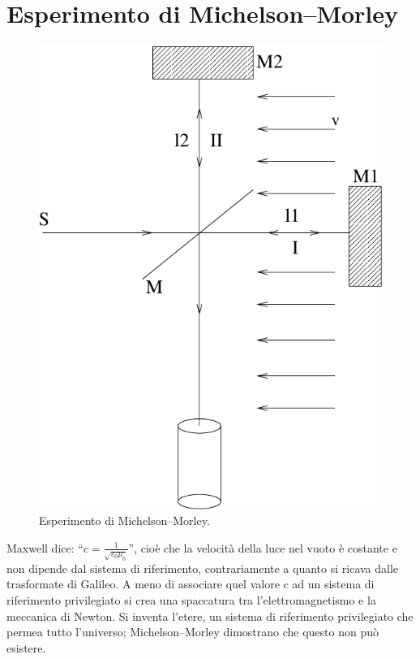 \section{Esperimento di Michelson--Morley}
\begin{figure}[htbp]
\centering
\includegraphics[scale=0.7]{immagini/fisica1/Morley}
\caption{Esperimento di Michelson--Morley.}
\end{figure}
Maxwell dice: ``$c=\frac{1}{\sqrt{\varepsilon_0\mu_0}}$'', cioè che la velocità della luce nel vuoto è costante e non dipende dal sistema di riferimento, contrariamente a quanto si ricava dalle trasformate di Galileo. A meno di associare quel valore $c$ ad un sistema di riferimento privilegiato si crea una spaccatura tra l'elettromagnetismo e la meccanica di Newton. Si inventa l'etere, un sistema di riferimento privilegiato che permea tutto l'universo; Michelson--Morley dimostrano che questo non può esistere.

